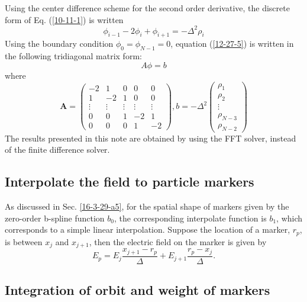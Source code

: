\documentclass{article}
\begin{document}
Using the center difference scheme for the second order derivative, the
discrete form of Eq. (\ref{10-11-1}) is written
\begin{equation}
  \label{12-27-5} \phi_{i - 1} - 2 \phi_i + \phi_{i + 1} = - \Delta^2 \rho_i
\end{equation}
Using the boundary condition $\phi_0 = \phi_{N - 1} = 0$, equation
(\ref{12-27-5}) is written in the following tridiagonal matrix form:
\begin{equation}
  \label{matrix} A \phi = b
\end{equation}
where
\begin{equation}
  \mathbf{A}= \left( \begin{array}{lllll}
    - 2 & 1 & 0 & 0 & 0\\
    1 & - 2 & 1 & 0 & 0\\
    \vdots & \vdots & \vdots & \vdots & \vdots\\
    0 & 0 & 1 & - 2 & 1\\
    0 & 0 & 0 & 1 & - 2
  \end{array} \right), b = - \Delta^2 \left( \begin{array}{l}
    \rho_1\\
    \rho_2\\
    \vdots\\
    \rho_{N - 3}\\
    \rho_{N - 2}
  \end{array} \right)
\end{equation}
The results presented in this note are obtained by using the FFT solver,
instead of the finite difference solver.

\subsection{Interpolate the field to particle markers}

As discussed in Sec. \ref{16-3-29-a5}, for the spatial shape of markers given
by the zero-order b-spline function $b_0$, the corresponding interpolate
function is $b_1$, which corresponds to a simple linear interpolation. Suppose
the location of a marker, $r_p$, is between $x_j$ and $x_{j + 1}$, then the
electric field on the marker is given by
\begin{equation}
  E_p = E_j \frac{x_{j + 1} - r_p}{\Delta} + E_{j + 1} \frac{r_p -
  x_j}{\Delta} .
\end{equation}

\subsection{Integration of orbit and weight of markers}
\end{document}
